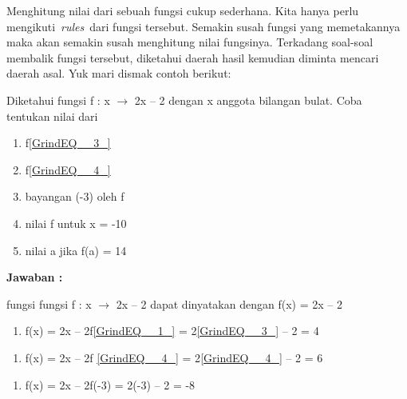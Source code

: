 \documentclass[11pt,fleqn]{book} %
\begin{document}
\noindent 

\noindent Menghitung nilai dari sebuah fungsi cukup sederhana. Kita hanya perlu mengikuti~\textit{rules}~dari fungsi tersebut. Semakin susah fungsi yang memetakannya maka akan semakin susah menghitung nilai fungsinya. Terkadang soal-soal membalik fungsi tersebut, diketahui daerah hasil kemudian diminta mencari daerah asal. Yuk mari dismak contoh berikut:

\noindent 

\noindent Diketahui fungsi f : x $\mathrm{\to}$ 2x -- 2 dengan x anggota bilangan bulat. Coba tentukan nilai dari

\noindent 

\begin{enumerate}
\item  f\eqref{GrindEQ__3_}

\item  f\eqref{GrindEQ__4_}

\item  bayangan (-3) oleh f

\item  nilai f untuk x = -10

\item  nilai a jika f(a) = 14
\end{enumerate}

\noindent 

\noindent \textbf{Jawaban :}

\noindent fungsi fungsi f : x $\mathrm{\to}$ 2x -- 2 dapat dinyatakan dengan f(x) = 2x -- 2

\noindent 

\begin{enumerate}
\item  f(x) = 2x -- 2f\eqref{GrindEQ__1_} = 2\eqref{GrindEQ__3_} -- 2 = 4
\end{enumerate}

\noindent 

\begin{enumerate}
\item  f(x) = 2x -- 2f \eqref{GrindEQ__4_} = 2\eqref{GrindEQ__4_} -- 2 = 6
\end{enumerate}

\noindent 

\begin{enumerate}
\item  f(x) = 2x -- 2f(-3) = 2(-3) -- 2 = -8
\end{enumerate}

\noindent 
\end{document}
